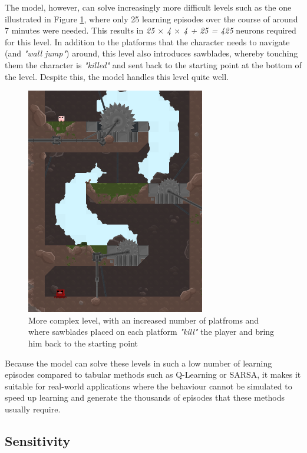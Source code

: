 \documentclass[10pt]{article}
\begin{document}
    The model, however, can solve increasingly more difficult levels such as the one illustrated in Figure \ref{fig:complexLevel}, where only 25 learning episodes over the course of around 7 minutes were needed. This results in \textit{25 $\times$ 4 $\times$ 4 + 25 = 425} neurons required for this level. In addition to the platforms that the character needs to navigate (and \textit{"wall jump"}) around, this level also introduces sawblades, whereby touching them the character is \textit{"killed"} and sent back to the starting point at the bottom of the level. Despite this, the model handles this level quite well.

    \begin{figure}[ht!]
    \centering
    \includegraphics[width=78mm]{./bladeLevelLong.png}
    \caption{More complex level, with an increased number of platfroms and where sawblades placed on each platform \textit{"kill"} the player and bring him back to the starting point}
    \label{fig:complexLevel}
    \end{figure}

    Because the model can solve these levels in such a low number of learning episodes compared to tabular methods such as Q-Learning or SARSA, it makes it suitable for real-world applications where the behaviour cannot be simulated to speed up learning and generate the thousands of episodes that these methods usually require.

    \subsection{Sensitivity}
\end{document}
